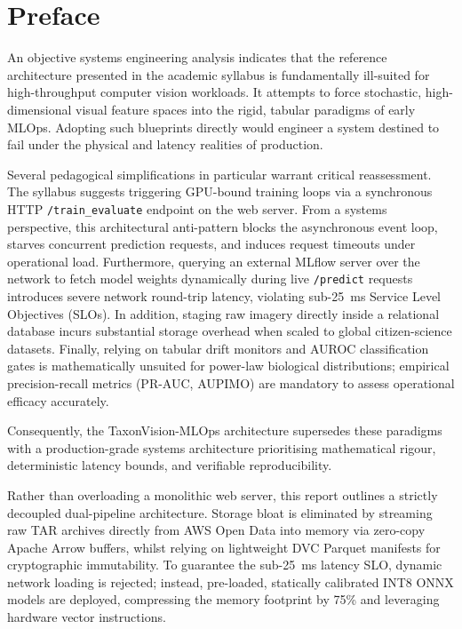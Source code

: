 \chapter*{Preface}

An objective systems engineering analysis indicates that the reference architecture presented in the academic syllabus is fundamentally ill-suited for high-throughput computer vision workloads. It attempts to force stochastic, high-dimensional visual feature spaces into the rigid, tabular paradigms of early MLOps. Adopting such blueprints directly would engineer a system destined to fail under the physical and latency realities of production.

Several pedagogical simplifications in particular warrant critical reassessment. The syllabus suggests triggering GPU-bound training loops via a synchronous HTTP \texttt{/train\_evaluate} endpoint on the web server. From a systems perspective, this architectural anti-pattern blocks the asynchronous event loop, starves concurrent prediction requests, and induces request timeouts under operational load. Furthermore, querying an external MLflow server over the network to fetch model weights dynamically during live \texttt{/predict} requests introduces severe network round-trip latency, violating sub-25~ms Service Level Objectives (SLOs). In addition, staging raw imagery directly inside a relational database incurs substantial storage overhead when scaled to global citizen-science datasets. Finally, relying on tabular drift monitors and AUROC classification gates is mathematically unsuited for power-law biological distributions; empirical precision-recall metrics (PR-AUC, AUPIMO) are mandatory to assess operational efficacy accurately.

Consequently, the TaxonVision-MLOps architecture supersedes these paradigms with a production-grade systems architecture prioritising mathematical rigour, deterministic latency bounds, and verifiable reproducibility.

Rather than overloading a monolithic web server, this report outlines a strictly decoupled dual-pipeline architecture. Storage bloat is eliminated by streaming raw TAR archives directly from AWS Open Data into memory via zero-copy Apache Arrow buffers, whilst relying on lightweight DVC Parquet manifests for cryptographic immutability. To guarantee the sub-25~ms latency SLO, dynamic network loading is rejected; instead, pre-loaded, statically calibrated INT8 ONNX models are deployed, compressing the memory footprint by 75\% and leveraging hardware vector instructions.

